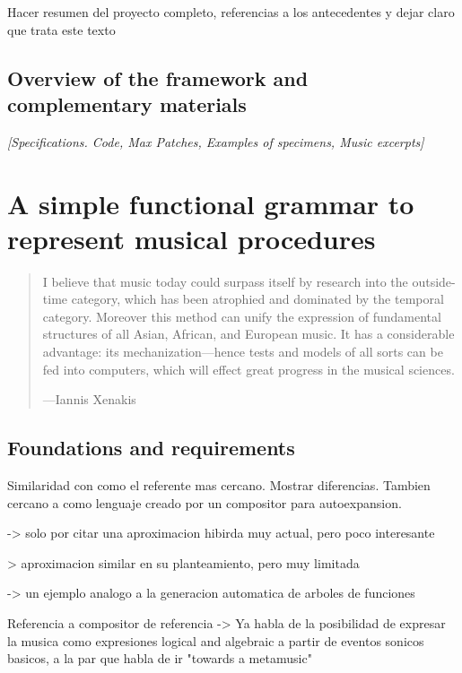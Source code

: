 \documentclass{article}
\begin{document}
Hacer resumen del proyecto completo, referencias a los antecedentes y dejar claro que trata este texto

\subsection{Overview of the framework and complementary materials}

{\color{gray} \textsl{[Specifications. Code, Max Patches, Examples of specimens, Music excerpts]}}




\section{A simple functional grammar to represent musical procedures}

\begin{samepage}
\begin{quotation}
I believe that music today could surpass itself by research into the outside-time category, which has been atrophied and dominated by the
temporal category. Moreover this method can unify the expression of
fundamental structures of all Asian, African, and European music. It has a
considerable advantage: its mechanization---hence tests and models of
all sorts can be fed into computers, which will effect great progress in the
musical sciences.

---Iannis Xenakis \cite{xenakis1971formalized}
\end{quotation}
\end{samepage}


\subsection{Foundations and requirements}









 



{\color{red}
Similaridad con \cite{Hofmann2015} como el referente mas cercano. Mostrar diferencias. Tambien cercano a \cite{ArizaOpenDesign} como lenguaje creado por un compositor para autoexpansion.

\cite{crawford2015algorithmic} -> solo por citar una aproximacion hibirda muy actual, pero poco interesante

\cite{delaPuente2002} > aproximacion similar en su planteamiento, pero muy limitada

\cite{Laine} -> un ejemplo analogo a la generacion automatica de arboles de funciones

Referencia a compositor de referencia -> \cite{xenakis1971formalized}
Ya habla de la posibilidad de expresar la musica como expresiones logical and algebraic a partir de eventos sonicos basicos, a la par que habla de ir "towards a metamusic" 
}
\end{document}

